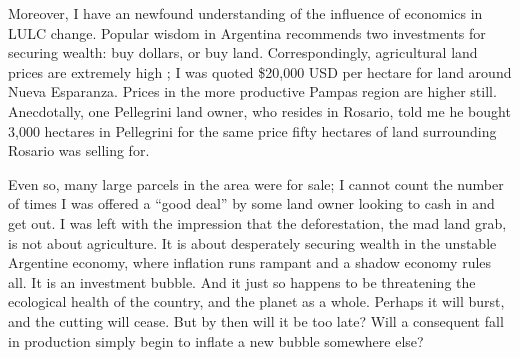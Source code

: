 Moreover, I have an newfound understanding of the influence of economics in LULC change. Popular wisdom in Argentina recommends two investments for securing wealth: buy dollars, or buy land. Correspondingly, agricultural land prices are extremely high \autocite{mercopress2010prime}; I was quoted \$20,000 USD per hectare for land around Nueva Esparanza. Prices in the more productive Pampas region are higher still. Anecdotally, one Pellegrini land owner, who resides in Rosario, told me he bought 3,000 hectares in Pellegrini for the same price fifty hectares of land surrounding Rosario was selling for.

Even so, many large parcels in the area were for sale; I cannot count the number of times I was offered a ``good deal'' by some land owner looking to cash in and get out. I was left with the impression that the deforestation, the mad land grab, is not about agriculture. It is about desperately securing wealth in the unstable Argentine economy, where inflation runs rampant and a shadow economy rules all. It is an investment bubble. And it just so happens to be threatening the ecological health of the country, and the planet as a whole. Perhaps it will burst, and the cutting will cease. But by then will it be too late? Will a consequent fall in production simply begin to inflate a new bubble somewhere else?











